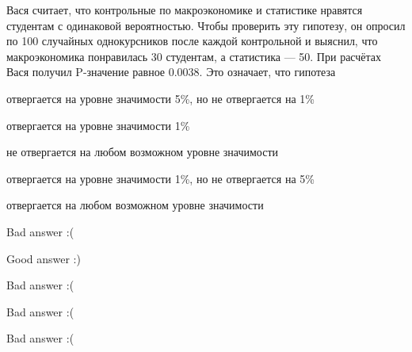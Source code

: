 
\begin{question}
Вася считает, что контрольные по макроэкономике и статистике нравятся
студентам с одинаковой вероятностью. Чтобы проверить эту гипотезу, он
опросил по 100 случайных однокурсников после каждой контрольной и
выяснил, что макроэкономика понравилась 30 студентам, а статистика ---
50. При расчётах Вася получил P-значение равное 0.0038. Это означает,
что гипотеза
\begin{answerlist}[2]
  \item отвергается на уровне значимости 5\%, но не отвергается на 1\%
  \item отвергается на уровне значимости 1\%
  \item не отвергается на любом возможном уровне значимости
  \item отвергается на уровне значимости 1\%, но не отвергается на 5\%
  \item отвергается на любом возможном уровне значимости
\end{answerlist}
\end{question}

\begin{solution}
\begin{answerlist}
  \item Bad answer :(
  \item Good answer :)
  \item Bad answer :(
  \item Bad answer :(
  \item Bad answer :(
\end{answerlist}
\end{solution}

